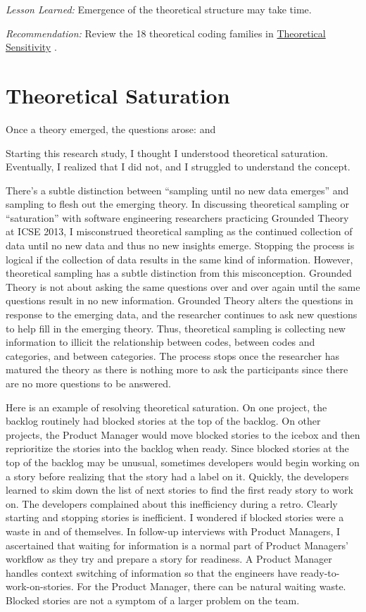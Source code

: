 \textit{Lesson Learned:} Emergence of the theoretical structure may take time.

\textit{Recommendation:} Review the 18 theoretical coding families in \underline{Theoretical Sensitivity} \cite{GlaserTheoreticalSensitivity}.

\section{Theoretical Saturation}
\label{TheoreticalSaturation}
Once a theory emerged, the questions arose:  and 

Starting this research study, I thought I understood theoretical saturation. Eventually, I realized that I did not, and I struggled to understand the concept. 

There's a subtle distinction between “sampling until no new data emerges” and sampling to flesh out the emerging theory. In discussing theoretical sampling or “saturation” with software engineering researchers practicing Grounded Theory at ICSE 2013, I misconstrued theoretical sampling as the continued collection of data until no new data and thus no new insights emerge. Stopping the process is logical if the collection of data results in the same kind of information. However, theoretical sampling has a subtle distinction from this misconception. Grounded Theory is not about asking the same questions over and over again until the same questions result in no new information. Grounded Theory alters the questions in response to the emerging data, and the researcher continues to ask new questions to help fill in the emerging theory. Thus, theoretical sampling is collecting new information to illicit the relationship between codes, between codes and categories, and between categories. The process stops once the researcher has matured the theory as there is nothing more to ask the participants since there are no more questions to be answered.

Here is an example of resolving theoretical saturation. On one project, the backlog routinely had blocked stories at the top of the backlog. On other projects, the Product Manager would move blocked stories to the icebox and then reprioritize the stories into the backlog when ready. Since blocked stories at the top of the backlog may be unusual, sometimes developers would begin working on a story before realizing that the story had a  label on it. Quickly, the developers learned to skim down the list of next stories to find the first ready story to work on. The developers complained about this inefficiency during a retro. Clearly starting and stopping stories is inefficient. I wondered if blocked stories were a waste in and of themselves. In follow-up interviews with Product Managers, I ascertained that waiting for information is a normal part of Product Managers' workflow as they try and prepare a story for readiness. A Product Manager handles context switching of information so that the engineers have ready-to-work-on-stories. For the Product Manager, there can be natural waiting waste. Blocked stories are not a symptom of a larger problem on the team.

